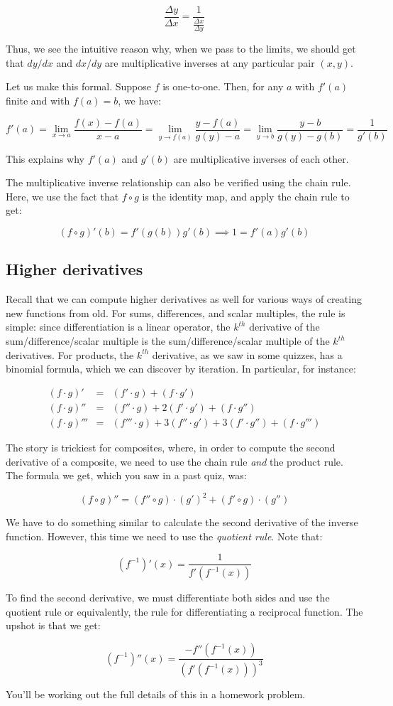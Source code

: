 \documentclass[10pt]{amsart}
\begin{document}
$$\frac{\Delta y}{\Delta x} = \frac{1}{\frac{\Delta x}{\Delta y}}$$

Thus, we see the intuitive reason why, when we pass to the limits, we
should get that $dy/dx$ and $dx/dy$ are multiplicative inverses at any
particular pair $(x,y)$.

Let us make this formal. Suppose $f$ is one-to-one. Then, for any $a$
with $f'(a)$ finite and with $f(a) = b$, we have:

$$f'(a) = \lim_{x \to a} \frac{f(x) - f(a)}{x - a} = \lim_{y \to f(a)} \frac{y - f(a)}{g(y) - a} = \lim_{y \to b} \frac{y - b}{g(y) - g(b)} = \frac{1}{g'(b)}$$

This explains why $f'(a)$ and $g'(b)$ are multiplicative inverses of
each other.

The multiplicative inverse relationship can also be verified using the
chain rule. Here, we use the fact that $f \circ g$ is the identity
map, and apply the chain rule to get:

$$(f \circ g)'(b) = f'(g(b))g'(b) \implies 1 = f'(a)g'(b)$$

\subsection{Higher derivatives}

Recall that we can compute higher derivatives as well for various ways
of creating new functions from old. For sums, differences, and scalar
multiples, the rule is simple: since differentiation is a linear
operator, the $k^{th}$ derivative of the sum/difference/scalar
multiple is the sum/difference/scalar multiple of the $k^{th}$
derivatives. For products, the $k^{th}$ derivative, as we saw in some
quizzes, has a binomial formula, which we can discover by
iteration. In particular, for instance:

\begin{eqnarray*}
  (f \cdot g)' & = & (f' \cdot g) + (f \cdot g')\\
  (f \cdot g)''& = & (f'' \cdot g) + 2(f' \cdot g') + (f \cdot g'')\\
  (f \cdot g)'''& = & (f''' \cdot g) + 3(f'' \cdot g') + 3(f' \cdot g'') + (f \cdot g''')
\end{eqnarray*}

The story is trickiest for composites, where, in order to compute the
second derivative of a composite, we need to use the chain rule {\em
and} the product rule. The formula we get, which you saw in a past
quiz, was:

$$(f \circ g)'' = (f'' \circ g) \cdot (g')^2 + (f' \circ g) \cdot (g'')$$

We have to do something similar to calculate the second derivative of
the inverse function. However, this time we need to use the {\em
quotient rule}. Note that:

$$(f^{-1})'(x) = \frac{1}{f'(f^{-1}(x))}$$

To find the second derivative, we must differentiate both sides and
use the quotient rule or equivalently, the rule for differentiating a
reciprocal function. The upshot is that we get:

$$(f^{-1})''(x) = \frac{-f''(f^{-1}(x))}{(f'(f^{-1}(x)))^3}$$

You'll be working out the full details of this in a homework problem.
\end{document}
